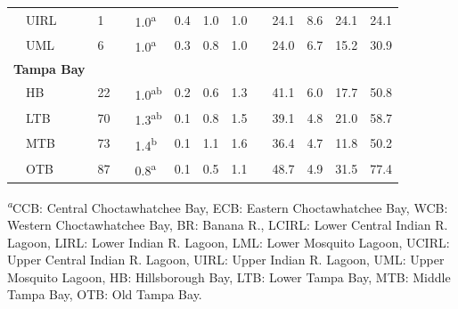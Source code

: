 \documentclass[letterpaper,12pt,oneside]{article}\usepackage[]{graphicx}\usepackage[]{color}
\begin{document}
\begin{table}[!tbp]
{\begin{center}
\begin{tabular}{llcllllcllll}
~~UIRL&1&&1.0\textsuperscript{a}&0.4&1.0&1.0&&24.1& 8.6&24.1&24.1\tabularnewline
~~UML&6&&1.0\textsuperscript{a}&0.3&0.8&1.0&&24.0& 6.7&15.2&30.9\tabularnewline
\hline
{\bfseries Tampa Bay}&&&&&&&&&&&\tabularnewline
~~HB&22&&1.0\textsuperscript{ab}&0.2&0.6&1.3&&41.1& 6.0&17.7&50.8\tabularnewline
~~LTB&70&&1.3\textsuperscript{ab}&0.1&0.8&1.5&&39.1& 4.8&21.0&58.7\tabularnewline
~~MTB&73&&1.4\textsuperscript{b}&0.1&1.1&1.6&&36.4& 4.7&11.8&50.2\tabularnewline
~~OTB&87&&0.8\textsuperscript{a}&0.1&0.5&1.1&&48.7& 4.9&31.5&77.4\tabularnewline
\hline
\end{tabular}\end{center}}
\textsuperscript{\textit{a}}\footnotesize CCB: Central Choctawhatchee Bay, ECB: Eastern Choctawhatchee Bay, WCB: Western Choctawhatchee Bay, BR: Banana R., LCIRL: Lower Central Indian R. Lagoon, LIRL: Lower Indian R. Lagoon, LML: Lower Mosquito Lagoon, UCIRL: Upper Central Indian R. Lagoon, UIRL: Upper Indian R. Lagoon, UML: Upper Mosquito Lagoon, HB: Hillsborough Bay, LTB: Lower Tampa Bay, MTB: Middle Tampa Bay, OTB: Old Tampa Bay.\end{table}


\clearpage


\end{document}
